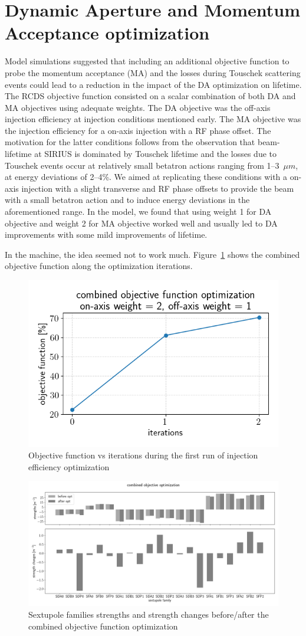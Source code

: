 \documentclass[a4paper,11pt]{article}
\begin{document}
\section{Dynamic Aperture and Momentum Acceptance optimization}
Model simulations suggested that including an additional objective function to probe the momentum acceptance (MA) and the losses during Touschek scattering events could lead to a reduction in the impact of the DA optimization on lifetime. The RCDS objective function consisted on a scalar combination of both DA and MA objectives using adequate weights.
The DA objective was the off-axis injection efficiency at injection conditions mentioned early. The MA objective was the injection efficiency for a on-axis injection with a RF phase offset. The motivation for the latter conditions follows from the observation that beam-lifetime at SIRIUS is dominated by Touschek lifetime and the losses due to Touschek events occur at relatively small betatron actions ranging from 1--3~$\unit{\mu m}$, at energy deviations of 2--4\%. We aimed at replicating these conditions with a on-axis injection with a slight transverse and RF phase offsets to provide the beam with a small betatron action and to induce energy deviations in the aforementioned range. 
In the model, we found that using weight 1 for DA objective and weight 2 for MA objective worked well and usually led to DA improvements with some mild improvements of lifetime.

In the machine, the idea seemed not to work much. Figure~\ref{combined_obd} shows the combined objective function along the optimization iterations.  
\begin{figure}[h]
    \centering
    \includegraphics[width=0.7\columnwidth]{combined_objective_function.png}
    \caption{Objective function vs iterations during the first run of injection efficiency optimization}
    \label{combined_obd}
\end{figure}\textbf{}

\begin{figure}[h]
    \centering
    \includegraphics*[width=\textwidth]{sexts_configs_combined_obj.png}
    \caption{Sextupole families strengths and strength changes before/after the combined objective function optimization}
    \label{combined_sexts}
\end{figure}
\end{document}
